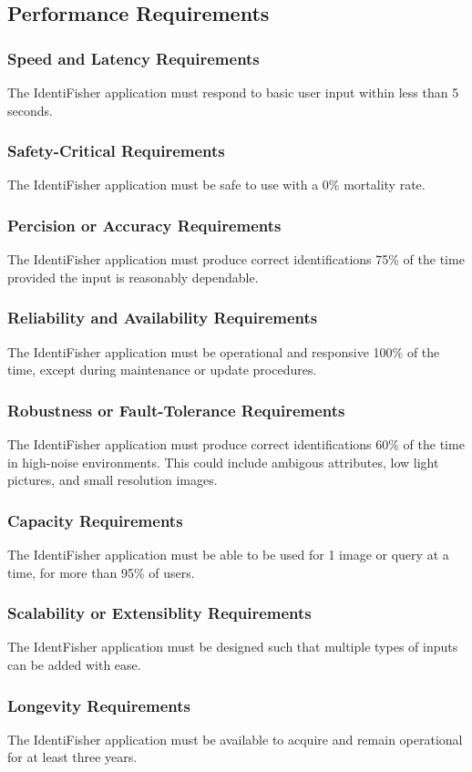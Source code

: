 \documentclass{article}
\begin{document}
\subsection{Performance Requirements}
\subsubsection{Speed and Latency Requirements}
The IdentiFisher application must respond to basic user input within less than 5 seconds.
\subsubsection{Safety-Critical Requirements}
The IdentiFisher application must be safe to use with a 0\% mortality rate.
\subsubsection{Percision or Accuracy Requirements}
The IdentiFisher application must produce correct identifications 75\% of the time provided the input is reasonably dependable.
\subsubsection{Reliability and Availability Requirements}
The IdentiFisher application must be operational and responsive 100\% of the time, except during maintenance or update procedures.
\subsubsection{Robustness or Fault-Tolerance Requirements}
The IdentiFisher application must produce correct identifications 60\% of the time in high-noise environments. This could include
ambigous attributes, low light pictures, and small resolution images.
\subsubsection{Capacity Requirements}
The IdentiFisher application must be able to be used for 1 image or query at a time, for more than 95\% of users.
\subsubsection{Scalability or Extensiblity Requirements}
The IdentFisher application must be designed such that multiple types of inputs can be added with ease.
\subsubsection{Longevity Requirements}
The IdentiFisher application must be available to acquire and remain operational for at least three years.
\end{document}
